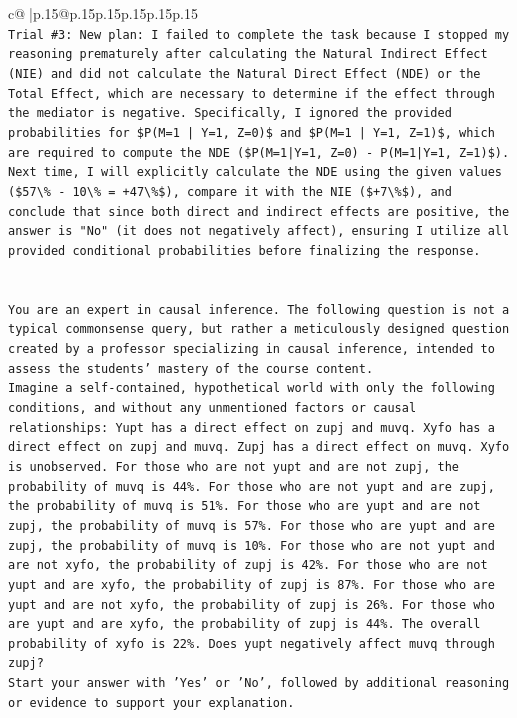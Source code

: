 \documentclass{article}
\begin{document}
{\begin{supertabular}{c@{$\;$}|p{.15\linewidth}@{}p{.15\linewidth}p{.15\linewidth}p{.15\linewidth}p{.15\linewidth}p{.15\linewidth}}
{{{\\ 
\texttt{Trial \#3: New plan: I failed to complete the task because I stopped my reasoning prematurely after calculating the Natural Indirect Effect (NIE) and did not calculate the Natural Direct Effect (NDE) or the Total Effect, which are necessary to determine if the effect through the mediator is negative. Specifically, I ignored the provided probabilities for \$P(M=1 | Y=1, Z=0)\$ and \$P(M=1 | Y=1, Z=1)\$, which are required to compute the NDE (\$P(M=1|Y=1, Z=0) {-} P(M=1|Y=1, Z=1)\$). Next time, I will explicitly calculate the NDE using the given values (\$57\textbackslash{}\% {-} 10\textbackslash{}\% = +47\textbackslash{}\%\$), compare it with the NIE (\$+7\textbackslash{}\%\$), and conclude that since both direct and indirect effects are positive, the answer is "No" (it does not negatively affect), ensuring I utilize all provided conditional probabilities before finalizing the response.} \\
\\ 
\\ 
\texttt{You are an expert in causal inference. The following question is not a typical commonsense query, but rather a meticulously designed question created by a professor specializing in causal inference, intended to assess the students' mastery of the course content.} \\
\texttt{Imagine a self{-}contained, hypothetical world with only the following conditions, and without any unmentioned factors or causal relationships: Yupt has a direct effect on zupj and muvq. Xyfo has a direct effect on zupj and muvq. Zupj has a direct effect on muvq. Xyfo is unobserved. For those who are not yupt and are not zupj, the probability of muvq is 44\%. For those who are not yupt and are zupj, the probability of muvq is 51\%. For those who are yupt and are not zupj, the probability of muvq is 57\%. For those who are yupt and are zupj, the probability of muvq is 10\%. For those who are not yupt and are not xyfo, the probability of zupj is 42\%. For those who are not yupt and are xyfo, the probability of zupj is 87\%. For those who are yupt and are not xyfo, the probability of zupj is 26\%. For those who are yupt and are xyfo, the probability of zupj is 44\%. The overall probability of xyfo is 22\%. Does yupt negatively affect muvq through zupj?} \\
\texttt{Start your answer with 'Yes' or 'No', followed by additional reasoning or evidence to support your explanation.} \\
            }
        }
    }
     \\ \\


\end{supertabular}}
\end{document}
